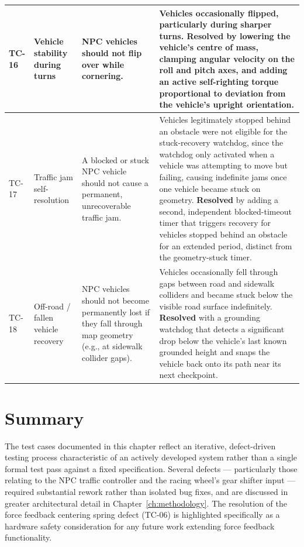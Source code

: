 {\begin{longtable}{|p{1.3cm}|p{3cm}|p{4.5cm}|p{4.5cm}|}
TC-16 & Vehicle stability during turns & NPC vehicles should not flip over while cornering. & Vehicles occasionally flipped, particularly during sharper turns. \textbf{Resolved} by lowering the vehicle's centre of mass, clamping angular velocity on the roll and pitch axes, and adding an active self-righting torque proportional to deviation from the vehicle's upright orientation. \\ \hline

TC-17 & Traffic jam self-resolution & A blocked or stuck NPC vehicle should not cause a permanent, unrecoverable traffic jam. & Vehicles legitimately stopped behind an obstacle were not eligible for the stuck-recovery watchdog, since the watchdog only activated when a vehicle was attempting to move but failing, causing indefinite jams once one vehicle became stuck on geometry. \textbf{Resolved} by adding a second, independent blocked-timeout timer that triggers recovery for vehicles stopped behind an obstacle for an extended period, distinct from the geometry-stuck timer. \\ \hline

TC-18 & Off-road / fallen vehicle recovery & NPC vehicles should not become permanently lost if they fall through map geometry (e.g., at sidewalk collider gaps). & Vehicles occasionally fell through gaps between road and sidewalk colliders and became stuck below the visible road surface indefinitely. \textbf{Resolved} with a grounding watchdog that detects a significant drop below the vehicle's last known grounded height and snaps the vehicle back onto its path near its next checkpoint. \\ \hline

\end{longtable}}

\section{Summary}
The test cases documented in this chapter reflect an iterative, defect-driven testing process characteristic of an actively developed system rather than a single formal test pass against a fixed specification. Several defects — particularly those relating to the NPC traffic controller and the racing wheel's gear shifter input — required substantial rework rather than isolated bug fixes, and are discussed in greater architectural detail in Chapter~\ref{ch:methodology}. The resolution of the force feedback centering spring defect (TC-06) is highlighted specifically as a hardware safety consideration for any future work extending force feedback functionality.